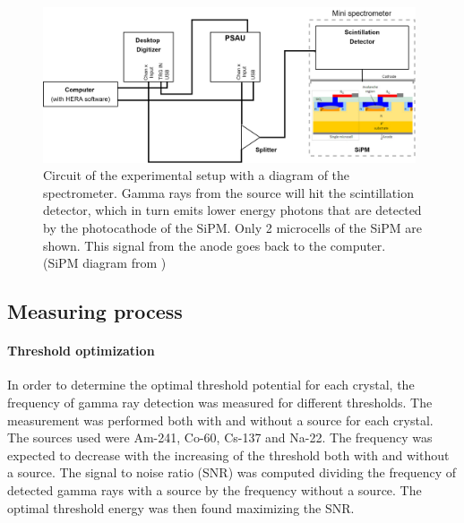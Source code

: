 \documentclass[a4paper, 11pt, table]{article}
\begin{document}
\begin{figure} [h!]
    \centering
    \includegraphics[width=0.98\textwidth]{figures/exp_setup_GMA.png}
    \caption{Circuit of the experimental setup with a diagram of the spectrometer. Gamma rays from the source will hit the scintillation detector, which in turn emits lower energy photons that are detected by the photocathode of the SiPM. Only 2 microcells of the SiPM are shown. This signal from the anode goes back to the computer. (SiPM diagram from \cite{kk_2016_what})}%
    \label{fig:setup}
\end{figure}


\subsection{Measuring process}
\paragraph{Threshold optimization}
In order to determine the optimal threshold potential for each crystal, the frequency of gamma ray detection was measured for different thresholds. The measurement was performed both with and without a source for each crystal. The sources used were Am-241, Co-60, Cs-137 and Na-22. The frequency was expected to decrease with the increasing of the threshold both with and without a source. The signal to noise ratio (SNR) was computed dividing the frequency of detected gamma rays with a source by the frequency without a source. The optimal threshold energy was then found maximizing the SNR.
\end{document}
